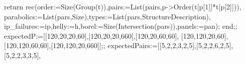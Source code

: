 \documentclass[
  10pt,
  letterpaper,
]{article}
\newenvironment{Shaded}{}{}
\newcommand{\BuiltInTok}[1]{\textcolor[rgb]{0.00,0.50,0.00}{#1}}
\newcommand{\ExtensionTok}[1]{#1}
\newcommand{\FloatTok}[1]{\textcolor[rgb]{0.25,0.63,0.44}{#1}}
\newcommand{\FunctionTok}[1]{\textcolor[rgb]{0.02,0.16,0.49}{#1}}
\newcommand{\NormalTok}[1]{#1}
\newcommand{\OperatorTok}[1]{\textcolor[rgb]{0.40,0.40,0.40}{#1}}
\newcommand{\VariableTok}[1]{\textcolor[rgb]{0.10,0.09,0.49}{#1}}
\begin{document}
\begin{Shaded}
\begin{Highlighting}[]
 \ExtensionTok{return} \ExtensionTok{rec}\NormalTok{(}\VariableTok{order}\OperatorTok{:=}\BuiltInTok{Size}\NormalTok{(}\BuiltInTok{Group}\NormalTok{(}\VariableTok{t}\NormalTok{))}\OperatorTok{,}\VariableTok{pairs}\OperatorTok{:=}\BuiltInTok{List}\NormalTok{(}\VariableTok{pairs}\OperatorTok{,}\VariableTok{p}\OperatorTok{{-}\textgreater{}}\BuiltInTok{Order}\NormalTok{(}\VariableTok{t}\NormalTok{[}\VariableTok{p}\NormalTok{[}\FloatTok{1}\NormalTok{]]}\OperatorTok{*}\VariableTok{t}\NormalTok{[}\VariableTok{p}\NormalTok{[}\FloatTok{2}\NormalTok{]]))}\OperatorTok{,}
  \VariableTok{parabolics}\OperatorTok{:=}\BuiltInTok{List}\NormalTok{(}\VariableTok{pars}\OperatorTok{,}\BuiltInTok{Size}\NormalTok{)}\OperatorTok{,}\VariableTok{types}\OperatorTok{:=}\BuiltInTok{List}\NormalTok{(}\VariableTok{pars}\OperatorTok{,}\BuiltInTok{StructureDescription}\NormalTok{)}\OperatorTok{,}
  \VariableTok{ip\_failures}\OperatorTok{:=}\VariableTok{ip}\OperatorTok{,}\VariableTok{helly}\OperatorTok{:=}\VariableTok{h}\OperatorTok{,}\VariableTok{borel}\OperatorTok{:=}\BuiltInTok{Size}\NormalTok{(}\BuiltInTok{Intersection}\NormalTok{(}\VariableTok{pars}\NormalTok{))}\OperatorTok{,}\VariableTok{panels}\OperatorTok{:=}\VariableTok{pan}\NormalTok{)}\OperatorTok{;}
\FunctionTok{end}\OperatorTok{;;}
\VariableTok{expectedP}\OperatorTok{:=}\NormalTok{[[}\FloatTok{120}\OperatorTok{,}\FloatTok{20}\OperatorTok{,}\FloatTok{20}\OperatorTok{,}\FloatTok{60}\NormalTok{]}\OperatorTok{,}\NormalTok{[}\FloatTok{120}\OperatorTok{,}\FloatTok{20}\OperatorTok{,}\FloatTok{20}\OperatorTok{,}\FloatTok{660}\NormalTok{]}\OperatorTok{,}\NormalTok{[}\FloatTok{120}\OperatorTok{,}\FloatTok{20}\OperatorTok{,}\FloatTok{60}\OperatorTok{,}\FloatTok{60}\NormalTok{]}\OperatorTok{,}
\NormalTok{ [}\FloatTok{120}\OperatorTok{,}\FloatTok{120}\OperatorTok{,}\FloatTok{20}\OperatorTok{,}\FloatTok{60}\NormalTok{]}\OperatorTok{,}\NormalTok{[}\FloatTok{120}\OperatorTok{,}\FloatTok{120}\OperatorTok{,}\FloatTok{60}\OperatorTok{,}\FloatTok{60}\NormalTok{]}\OperatorTok{,}\NormalTok{[}\FloatTok{120}\OperatorTok{,}\FloatTok{120}\OperatorTok{,}\FloatTok{20}\OperatorTok{,}\FloatTok{660}\NormalTok{]]}\OperatorTok{;;}
\VariableTok{expectedPairs}\OperatorTok{:=}\NormalTok{[[}\FloatTok{5}\OperatorTok{,}\FloatTok{2}\OperatorTok{,}\FloatTok{2}\OperatorTok{,}\FloatTok{3}\OperatorTok{,}\FloatTok{2}\OperatorTok{,}\FloatTok{5}\NormalTok{]}\OperatorTok{,}\NormalTok{[}\FloatTok{5}\OperatorTok{,}\FloatTok{2}\OperatorTok{,}\FloatTok{2}\OperatorTok{,}\FloatTok{6}\OperatorTok{,}\FloatTok{2}\OperatorTok{,}\FloatTok{5}\NormalTok{]}\OperatorTok{,}\NormalTok{[}\FloatTok{5}\OperatorTok{,}\FloatTok{2}\OperatorTok{,}\FloatTok{2}\OperatorTok{,}\FloatTok{3}\OperatorTok{,}\FloatTok{3}\OperatorTok{,}\FloatTok{5}\NormalTok{]}\OperatorTok{,}

\end{Highlighting}
\end{Shaded}
\end{document}

